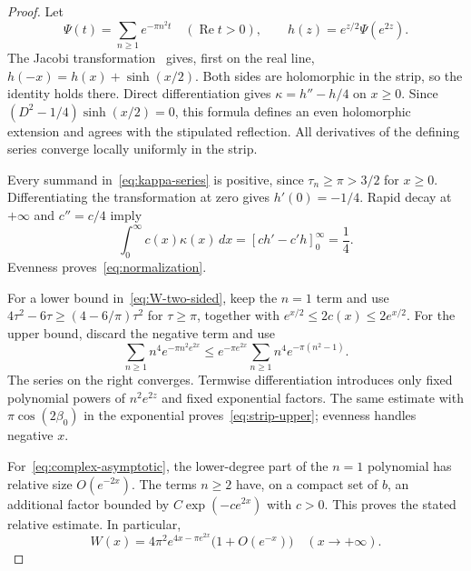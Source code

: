 \documentclass[11pt,a4paper]{article}
\numberwithin{equation}{section}
\theoremstyle{definition}
\theoremstyle{remark}
\begin{document}
\begin{proof}
Let
\[
 \Psi(t)=\sum_{n\ge1}e^{-\pi n^2t}\quad(\operatorname{Re}t>0),\qquad
 h(z)=e^{z/2}\Psi(e^{2z}).
\]
The Jacobi transformation~\cite[Eq.~20.7.32]{DLMFtheta} gives, first on the real line,
$h(-x)=h(x)+\sinh(x/2)$. Both sides are holomorphic in the strip, so the identity holds there. Direct differentiation gives
$\kappa=h''-h/4$ on $x\ge0$. Since $(D^2-1/4)\sinh(x/2)=0$, this formula defines an even holomorphic extension and agrees with the stipulated reflection. All derivatives of the defining series converge locally uniformly in the strip.

Every summand in~\eqref{eq:kappa-series} is positive, since $\tau_n\ge\pi>3/2$ for $x\ge0$. Differentiating the transformation at zero gives $h'(0)=-1/4$. Rapid decay at $+\infty$ and $c''=c/4$ imply
\[
 \int_0^\infty c(x)\kappa(x)\,dx
 =[ch'-c'h]_0^\infty=\frac14.
\]
Evenness proves~\eqref{eq:normalization}.

For a lower bound in~\eqref{eq:W-two-sided}, keep the $n=1$ term and use
$4\tau^2-6\tau\ge(4-6/\pi)\tau^2$ for $\tau\ge\pi$, together with
$e^{x/2}\le2c(x)\le2e^{x/2}$. For the upper bound, discard the negative term and use
\[
 \sum_{n\ge1} n^4e^{-\pi n^2e^{2x}}
 \le e^{-\pi e^{2x}}\sum_{n\ge1}n^4e^{-\pi(n^2-1)}.
\]
The series on the right converges. Termwise differentiation introduces only fixed polynomial powers of $n^2e^{2z}$ and fixed exponential factors. The same estimate with $\pi\cos(2\beta_0)$ in the exponential proves~\eqref{eq:strip-upper}; evenness handles negative $x$.

For~\eqref{eq:complex-asymptotic}, the lower-degree part of the $n=1$ polynomial has relative size $O(e^{-2x})$. The terms $n\ge2$ have, on a compact set of $b$, an additional factor bounded by $C\exp(-c e^{2x})$ with $c>0$. This proves the stated relative estimate. In particular,
\begin{equation}\label{eq:W-asymptotic}
 W(x)=4\pi^2e^{4x-\pi e^{2x}}\bigl(1+O(e^{-x})\bigr)
 \quad(x\to+\infty).
\end{equation}
\end{proof}
\end{document}
